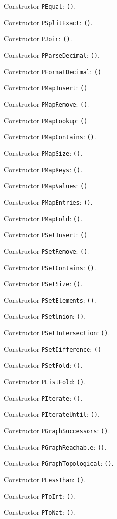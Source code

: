 \documentclass[11pt]{article}
\begin{document}
\noindent Constructor \texttt{PEqual}: \texttt{()}.\par
\noindent Constructor \texttt{PSplitExact}: \texttt{()}.\par
\noindent Constructor \texttt{PJoin}: \texttt{()}.\par
\noindent Constructor \texttt{PParseDecimal}: \texttt{()}.\par
\noindent Constructor \texttt{PFormatDecimal}: \texttt{()}.\par
\noindent Constructor \texttt{PMapInsert}: \texttt{()}.\par
\noindent Constructor \texttt{PMapRemove}: \texttt{()}.\par
\noindent Constructor \texttt{PMapLookup}: \texttt{()}.\par
\noindent Constructor \texttt{PMapContains}: \texttt{()}.\par
\noindent Constructor \texttt{PMapSize}: \texttt{()}.\par
\noindent Constructor \texttt{PMapKeys}: \texttt{()}.\par
\noindent Constructor \texttt{PMapValues}: \texttt{()}.\par
\noindent Constructor \texttt{PMapEntries}: \texttt{()}.\par
\noindent Constructor \texttt{PMapFold}: \texttt{()}.\par
\noindent Constructor \texttt{PSetInsert}: \texttt{()}.\par
\noindent Constructor \texttt{PSetRemove}: \texttt{()}.\par
\noindent Constructor \texttt{PSetContains}: \texttt{()}.\par
\noindent Constructor \texttt{PSetSize}: \texttt{()}.\par
\noindent Constructor \texttt{PSetElements}: \texttt{()}.\par
\noindent Constructor \texttt{PSetUnion}: \texttt{()}.\par
\noindent Constructor \texttt{PSetIntersection}: \texttt{()}.\par
\noindent Constructor \texttt{PSetDifference}: \texttt{()}.\par
\noindent Constructor \texttt{PSetFold}: \texttt{()}.\par
\noindent Constructor \texttt{PListFold}: \texttt{()}.\par
\noindent Constructor \texttt{PIterate}: \texttt{()}.\par
\noindent Constructor \texttt{PIterateUntil}: \texttt{()}.\par
\noindent Constructor \texttt{PGraphSuccessors}: \texttt{()}.\par
\noindent Constructor \texttt{PGraphReachable}: \texttt{()}.\par
\noindent Constructor \texttt{PGraphTopological}: \texttt{()}.\par
\noindent Constructor \texttt{PLessThan}: \texttt{()}.\par
\noindent Constructor \texttt{PToInt}: \texttt{()}.\par
\noindent Constructor \texttt{PToNat}: \texttt{()}.\par
\end{document}
